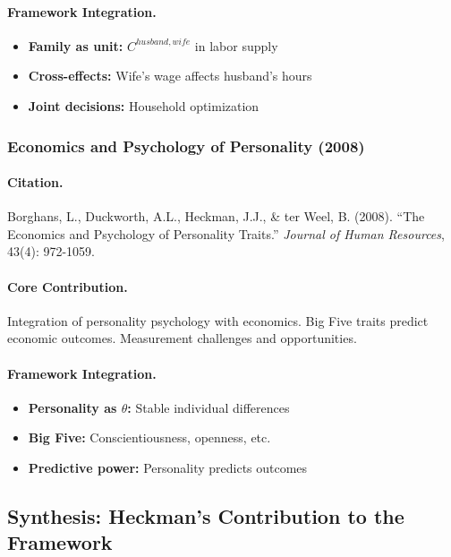 \paragraph{Framework Integration.}
\begin{itemize}
  \item \textbf{Family as unit:} $C^{husband,wife}$ in labor supply
  \item \textbf{Cross-effects:} Wife's wage affects husband's hours
  \item \textbf{Joint decisions:} Household optimization
\end{itemize}

\subsubsection{Economics and Psychology of Personality (2008)}

\paragraph{Citation.}
Borghans, L., Duckworth, A.L., Heckman, J.J., \& ter Weel, B. (2008).
``The Economics and Psychology of Personality Traits.''
\emph{Journal of Human Resources}, 43(4): 972-1059.

\paragraph{Core Contribution.}
Integration of personality psychology with economics. Big Five traits
predict economic outcomes. Measurement challenges and opportunities.

\paragraph{Framework Integration.}
\begin{itemize}
  \item \textbf{Personality as $\theta$:} Stable individual differences
  \item \textbf{Big Five:} Conscientiousness, openness, etc.
  \item \textbf{Predictive power:} Personality predicts outcomes
\end{itemize}

\subsection{Synthesis: Heckman's Contribution to the Framework}

